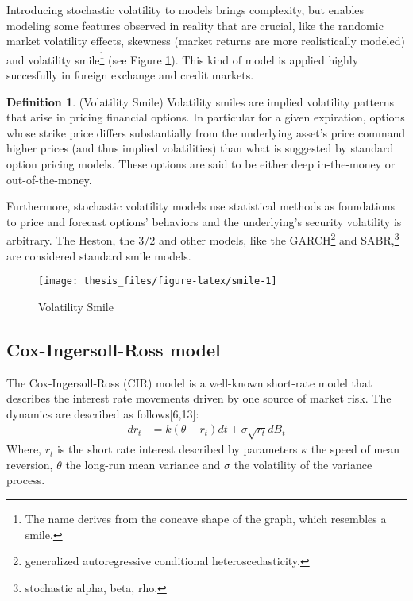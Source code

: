 \documentclass[12pt,twoside]{reedthesis}
\theoremstyle{definition}
\newtheorem{definition}{Definition}[section]
\theoremstyle{definition}
\theoremstyle{remark}
\begin{document}
  Introducing stochastic volatility to models brings complexity, but
  enables modeling some features observed in reality that are crucial,
  like the randomic market volatility effects, skewness (market returns
  are more realistically modeled) and volatility smile\footnote{The name
    derives from the concave shape of the graph, which resembles a smile.}
  (see Figure \ref{fig:smile}). This kind of model is applied highly
  succesfully in foreign exchange and credit markets.
  \begin{definition}{(Volatility Smile)} 
  Volatility smiles are implied volatility patterns that arise in pricing financial options. In particular for a given expiration, options whose strike price differs substantially from the underlying asset's price command higher prices (and thus implied volatilities) than what is suggested by standard option pricing models. These options are said to be either deep in-the-money or out-of-the-money.
  \end{definition}
  Furthermore, stochastic volatility models use statistical methods as
  foundations to price and forecast options' behaviors and the
  underlying's security volatility is arbitrary. The Heston, the \(3/2\)
  and other models, like the GARCH\footnote{generalized autoregressive
    conditional heteroscedasticity.} and SABR,\footnote{stochastic alpha,
    beta, rho.} are considered standard smile models.
  \begin{figure}
  
  {\centering \texttt{[image: thesis\_files/figure-latex/smile-1]} 
  
  }
  
  \caption{Volatility Smile \label{smile}}\label{fig:smile}
  \end{figure}
  \subsection{Cox-Ingersoll-Ross model}\label{cir}
  
  The Cox-Ingersoll-Ross (CIR) model is a well-known short-rate model that
  describes the interest rate movements driven by one source of market
  risk. The dynamics are described as follows{[}6,13{]}:
  \begin{align}
  \label{eq:cir}
  dr_t &= k(\theta - r_t)dt + \sigma \sqrt{r_t} dB_t
  \end{align}
  \noindent
  Where, \(r_t\) is the short rate interest described by parameters
  \(\kappa\) the speed of mean reversion, \(\theta\) the long-run mean
  variance and \(\sigma\) the volatility of the variance process.
  
\end{document}
